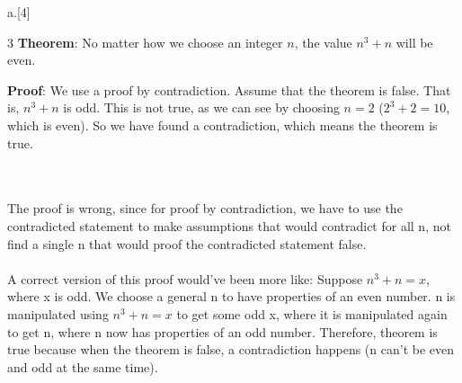 \begin{question}{a.}[4]
\begin{Questions}
    \end{Questions}

  \item[3] \textbf{Theorem}: No matter  how we choose an integer $n$, the  value $n^3 + n$
    will be even.

    \noindent\textbf{Proof}: We use  a proof by contradiction. Assume that  the theorem is
    false. That is, $n^3 + n$ is odd. This is  not true, as we can see by choosing $n = 2$
    ($2^3 +  2 = 10$,  which is even).  So we have found  a contradiction, which  means the
    theorem is true.
    \begin{Questions}
    \\
    {\color{NavyBlue} \\The proof is wrong, since for proof by contradiction, we have to use the contradicted statement to make assumptions that would contradict for all n, not find a single n that would proof the contradicted statement false.
    \\
    \\A correct version of this proof would've been more like: Suppose $n^3 + n = x$, where x is odd. We choose a general n to have properties of an even number. n is manipulated using $n^3 + n = x$ to get some odd x, where it is manipulated again to get n, where n now has properties of an odd number. Therefore, theorem is true because when the theorem is false, a contradiction happens (n can't be even and odd at the same time).}
    
      \vfill\eject
    \end{Questions}
  \end{question}
